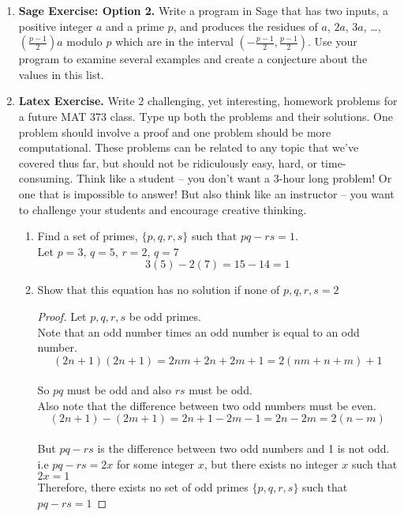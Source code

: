\documentclass[11 pt]{article}
\theoremstyle{definition}
\theoremstyle{definition}
\begin{document}
\begin{enumerate}
\item[] {\bf Sage Exercise: Option 2.} Write a program in Sage that has two inputs, a positive integer $a$ and a prime $p$, and produces the residues of $a$, $2a$, $3a$, \dots , $\left( \frac{p-1}{2} \right) a$ modulo $p$ which are in the interval $\left( -\frac{p-1}{2}, \frac{p-1}{2} \right)$.  Use your program to examine several examples and create a conjecture about the values in this list.  

\item {\bf Latex Exercise.} Write 2 challenging, yet interesting, homework problems for a future MAT 373 class.  Type up both the problems and their solutions. One problem should involve a proof and one problem should be more computational.  These problems can be related to any topic that we've covered thus far, but should not be ridiculously easy, hard, or time-consuming.  Think like a student -- you don't want a 3-hour long problem!  Or one that is impossible to answer!  But also think like an instructor -- you want to challenge your students and encourage creative thinking.
    \begin{enumerate}
        \item{}
            Find a set of primes, $\{p,q,r,s\}$ such that $pq-rs=1$.
            \\Let $p=3$, $q=5$, $r=2$, $q=7$
            \\$$3(5)-2(7)=15-14=1$$
        \item{}
            Show that this equation has no solution if none of $p,q,r,s=2$
            \begin{proof}
                Let $p,q,r,s$ be odd primes.
                \\Note that an odd number times an odd number is equal to an odd number.
                $$(2n+1)(2n+1)=2nm+2n+2m+1=2(nm+n+m)+1$$
                \\So $pq$ must be odd and also $rs$ must be odd.
                \\Also note that the difference between two odd numbers must be even.
                $$(2n+1)-(2m+1)=2n+1-2m-1=2n-2m=2(n-m)$$
                \\But $pq-rs$ is the difference between two odd numbers and 1 is not odd.
                \\i.e $pq-rs=2x$ for some integer $x$, but there exists no integer $x$
                such that $2x = 1$
                \\Therefore, there exists no set of odd primes $\{p,q,r,s\}$ such that $pq-rs=1$
            \end{proof}


    \end{enumerate}


\end{enumerate}
\end{document}
